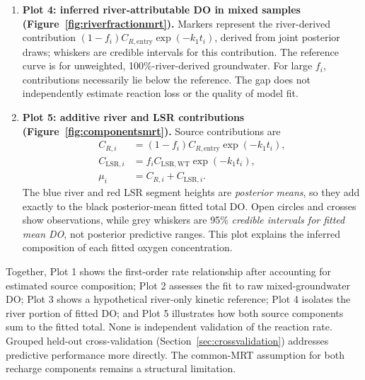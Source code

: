 \documentclass[11pt,a4paper]{article}
\newcommand{\LSR}{\mathrm{LSR}}
\begin{document}
\begin{enumerate}[leftmargin=17pt,itemsep=4pt]
\item \textbf{Plot 4: inferred river-attributable DO in mixed samples (Figure~\ref{fig:riverfractionmrt}).} Markers represent the river-derived contribution $(1-f_i)C_{R,\mathrm{entry}}\exp(-k_1t_i)$, derived from joint posterior draws; whiskers are credible intervals for this contribution. The reference curve is for unweighted, 100\%-river-derived groundwater. For large $f_i$, contributions necessarily lie below the reference. The gap does not independently estimate reaction loss or the quality of model fit.

\item \textbf{Plot 5: additive river and LSR contributions (Figure~\ref{fig:componentsmrt}).} Source contributions are
\begin{align}
 C_{R,i}&=(1-f_i)C_{R,\mathrm{entry}}\exp(-k_1t_i),\\
 C_{\LSR,i}&=f_i C_{\LSR,\mathrm{WT}}\exp(-k_1t_i),\\
 \mu_i&=C_{R,i}+C_{\LSR,i}.
\end{align}
The blue river and red LSR segment heights are \emph{posterior means}, so they add exactly to the black posterior-mean fitted total DO. Open circles and crosses show observations, while grey whiskers are 95\% \emph{credible intervals for fitted mean DO}, not posterior predictive ranges. This plot explains the inferred composition of each fitted oxygen concentration.
\end{enumerate}

Together, Plot 1 shows the first-order rate relationship after accounting for estimated source composition; Plot 2 assesses the fit to raw mixed-groundwater DO; Plot 3 shows a hypothetical river-only kinetic reference; Plot 4 isolates the river portion of fitted DO; and Plot 5 illustrates how both source components sum to the fitted total. None is independent validation of the reaction rate. Grouped held-out cross-validation (Section~\ref{sec:crossvalidation}) addresses predictive performance more directly. The common-MRT assumption for both recharge components remains a structural limitation.
\end{document}
